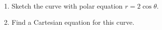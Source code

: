 \begin{frame}[t]
\begin{example} %
\begin{enumerate}
\item<1-| alert@2-21> Sketch the curve with polar equation \alert<handout:0| 26>{$r = 2\cos \theta$}.
\item<1-| alert@22-> Find a Cartesian equation for this curve.
\end{enumerate}
\begin{columns}[c]

\end{columns}
\end{example}
\end{frame}
